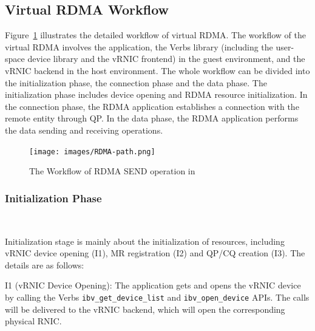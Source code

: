 \subsection{Virtual RDMA Workflow}


Figure~\ref{fig:rdma-path} illustrates the detailed workflow of virtual RDMA. The workflow of the virtual RDMA involves the application, the Verbs library (including the user-space device library and the vRNIC frontend) in the guest environment, and the vRNIC backend in the host environment.
The whole workflow can be divided into the initialization phase, the connection phase and the data phase. The initialization phase includes device opening and RDMA resource initialization.
In the connection phase, the RDMA application establishes a connection with the remote entity through QP.
In the data phase, the RDMA application performs the data sending and receiving operations.

\begin{figure}[!ht]
	\centering
	\texttt{[image: images/RDMA-path.png]}
	\caption{The Workflow of RDMA SEND operation in \sys}
	\label{fig:rdma-path}
\end{figure}

\subsubsection{\textbf{Initialization Phase}}
\
\noindent

Initialization stage is mainly about the initialization of resources, including vRNIC device opening (I1), MR registration (I2) and QP/CQ creation (I3). The details are as follows:


I1 (vRNIC Device Opening): The application gets and opens the vRNIC device by calling the Verbs \texttt{ibv\_get\_device\_list} and \texttt{ibv\_open\_device} APIs. The calls will be delivered to the vRNIC backend, which will open the corresponding physical RNIC.

